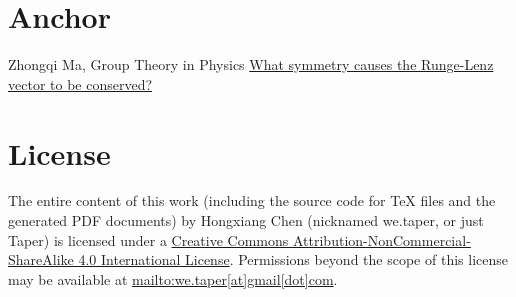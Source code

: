 \documentclass{article}
\numberwithin{equation}{subsection} %
\theoremstyle{definition}
\begin{document}
\section{Anchor}
\label{sec:Anchor}

\begin{thebibliography}{1}
     Zhongqi Ma, Group Theory in Physics
     \href{physics.stackexchange.com/questions/18088/what-symmetry-causes-the-runge-lenz-vector-to-be-conserved}{What symmetry causes the Runge-Lenz vector to be conserved?}
\end{thebibliography}
\printnomenclature
\section{License}
The entire content of this work (including the source code
for TeX files and the generated PDF documents) by 
Hongxiang Chen (nicknamed we.taper, or just Taper) is
licensed under a 
\href{http://creativecommons.org/licenses/by-nc-sa/4.0/}{Creative 
Commons Attribution-NonCommercial-ShareAlike 4.0 International 
License}. Permissions beyond the scope of this 
license may be available at \url{mailto:we.taper[at]gmail[dot]com}.
\end{document}
